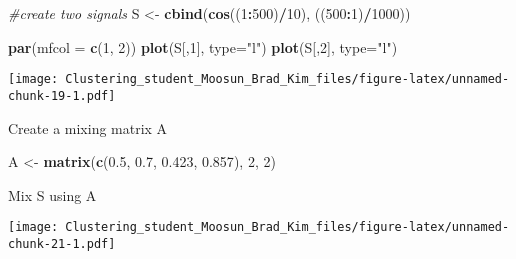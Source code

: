 \documentclass[11pt,]{article}
\newenvironment{Shaded}{\begin{snugshade}}{\end{snugshade}}
\newcommand{\CommentTok}[1]{\textcolor[rgb]{0.56,0.35,0.01}{\textit{#1}}}
\newcommand{\DataTypeTok}[1]{\textcolor[rgb]{0.13,0.29,0.53}{#1}}
\newcommand{\DecValTok}[1]{\textcolor[rgb]{0.00,0.00,0.81}{#1}}
\newcommand{\FloatTok}[1]{\textcolor[rgb]{0.00,0.00,0.81}{#1}}
\newcommand{\KeywordTok}[1]{\textcolor[rgb]{0.13,0.29,0.53}{\textbf{#1}}}
\newcommand{\NormalTok}[1]{#1}
\newcommand{\OperatorTok}[1]{\textcolor[rgb]{0.81,0.36,0.00}{\textbf{#1}}}
\newcommand{\StringTok}[1]{\textcolor[rgb]{0.31,0.60,0.02}{#1}}
\begin{document}
\begin{Shaded}
\begin{Highlighting}[]
\CommentTok{#create two signals}
\NormalTok{S <-}\StringTok{ }\KeywordTok{cbind}\NormalTok{(}\KeywordTok{cos}\NormalTok{((}\DecValTok{1}\OperatorTok{:}\DecValTok{500}\NormalTok{)}\OperatorTok{/}\DecValTok{10}\NormalTok{), ((}\DecValTok{500}\OperatorTok{:}\DecValTok{1}\NormalTok{)}\OperatorTok{/}\DecValTok{1000}\NormalTok{))}

\KeywordTok{par}\NormalTok{(}\DataTypeTok{mfcol =} \KeywordTok{c}\NormalTok{(}\DecValTok{1}\NormalTok{, }\DecValTok{2}\NormalTok{))}
\KeywordTok{plot}\NormalTok{(S[,}\DecValTok{1}\NormalTok{], }\DataTypeTok{type=}\StringTok{"l"}\NormalTok{)}
\KeywordTok{plot}\NormalTok{(S[,}\DecValTok{2}\NormalTok{], }\DataTypeTok{type=}\StringTok{"l"}\NormalTok{)}
\end{Highlighting}
\end{Shaded}

\texttt{[image: Clustering\_student\_Moosun\_Brad\_Kim\_files/figure-latex/unnamed-chunk-19-1.pdf]}

Create a mixing matrix A

\begin{Shaded}
\begin{Highlighting}[]
\NormalTok{A <-}\StringTok{ }\KeywordTok{matrix}\NormalTok{(}\KeywordTok{c}\NormalTok{(}\FloatTok{0.5}\NormalTok{, }\FloatTok{0.7}\NormalTok{, }\FloatTok{0.423}\NormalTok{, }\FloatTok{0.857}\NormalTok{), }\DecValTok{2}\NormalTok{, }\DecValTok{2}\NormalTok{)}
\end{Highlighting}
\end{Shaded}

Mix S using A

\begin{Shaded}
\end{Shaded}

\texttt{[image: Clustering\_student\_Moosun\_Brad\_Kim\_files/figure-latex/unnamed-chunk-21-1.pdf]}
\end{document}
